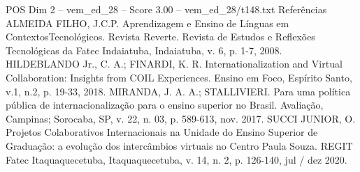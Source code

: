 \begin{textsample}{POS Dim 2 – vem\_ed\_28 – Score 3.00 – vem\_ed\_28/t148.txt}
Referências ALMEIDA FILHO, J.C.P.
Aprendizagem e Ensino de Línguas em ContextosTecnológicos.
Revista Reverte.
Revista de Estudos e Reflexões Tecnológicas da Fatec Indaiatuba, Indaiatuba, v. 6, p. 1-7, 2008.
HILDEBLANDO Jr., C.
A.; FINARDI, K.
R.
Internationalization and Virtual Collaboration: Insights from COIL Experiences.
Ensino em Foco, Espírito Santo, v.1, n.2, p. 19-33, 2018.
MIRANDA, J.
A.
A.; STALLIVIERI.
Para uma política pública de internacionalização para o ensino superior no Brasil.
Avaliação, Campinas; Sorocaba, SP, v. 22, n. 03, p. 589-613, nov. 2017.
SUCCI JUNIOR, O.
Projetos Colaborativos Internacionais na Unidade do Ensino Superior de Graduação: a evolução dos intercâmbios virtuais no Centro Paula Souza.
REGIT Fatec Itaquaquecetuba, Itaquaquecetuba, v. 14, n. 2, p. 126-140, jul / dez 2020.

\end{textsample}
